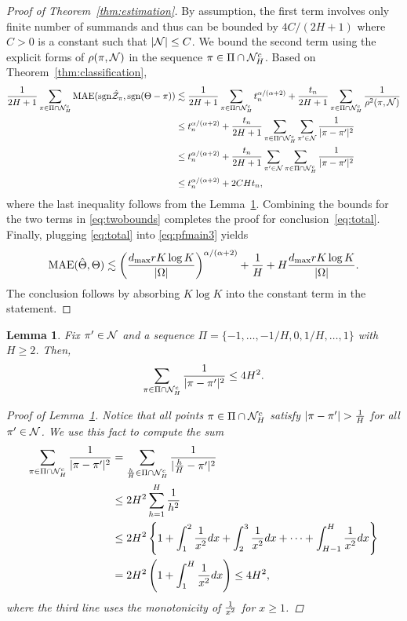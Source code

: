 \documentclass[11pt]{article}
\theoremstyle{plain}
\newtheorem{lem}{Lemma}[section]
\theoremstyle{definition}
\def\sign{\textup{sgn}}
\begin{document}
\begin{proof}[Proof of Theorem~\ref{thm:estimation}]
By assumption, the first term involves only finite number of summands and thus can be bounded by $4C/ (2H+1)$ where $C>0$ is a constant such that $|\mathcal{N}|\leq C$.  We bound the second term using the explicit forms of $\rho(\pi, \mathcal{N})$ in the sequence $\pi \in\Pi\cap \mathcal{N}_H^c$. Based on Theorem~\ref{thm:classification}, 
\begin{align}
{1\over 2H+1}\sum_{\pi \in \Pi\cap \tN_H^c} \textup{MAE}(\sign \hat \tZ_\pi, \sign (\Theta-\pi)) &\lesssim  {1\over 2H+1}\sum_{\pi\in \Pi\cap \tN_H^c} t_n^{\alpha/(\alpha+2)}+{t_n\over 2H+1}\sum_{\pi \in \Pi\cap \tN_H^c}{1\over \rho^2(\pi, \tN)}\\
&\leq t_n^{\alpha/(\alpha+2)}+{t_n\over 2H+1} \sum_{\pi \in \Pi\cap \tN_H^c} \sum_{\pi' \in \tN}{1\over |\pi-\pi'|^2}\\
&\leq  t_n^{\alpha/(\alpha+2)}+{t_n\over 2H+1} \sum_{\pi'\in \tN} \sum_{\pi \in \Pi\cap \tN_H^c}{1\over |\pi-\pi'|^2}\\
&\leq t_n^{\alpha/(\alpha+2)}+ 2CHt_n,
\end{align}
where the last inequality follows from the Lemma~\ref{lem:H}.  Combining the bounds for the two terms in \eqref{eq:twobounds} completes the proof for conclusion~\eqref{eq:total}. Finally, plugging \eqref{eq:total} into \eqref{eq:pfmain3} yields
\begin{align}
\text{MAE}(\hat\Theta,\Theta)\lesssim \left(d_{\max}rK\log K\over |\Omega|\right)^{\alpha/(\alpha+2)}+\frac{1}{H}+H{d_{\max}rK\log K\over |\Omega|}.
 \end{align}
The conclusion follows by absorbing $K\log K$ into the constant term in the statement. 
\end{proof}


\begin{lem}\label{lem:H}
Fix $\pi'\in\mathcal{N}$ and a sequence $\Pi=\{-1,\ldots,-1/H,0,1/H,\ldots,1\}$ with $H\geq 2$. Then, 
\[
\sum_{\pi \in \Pi\cap \mathcal{N}_H^c}{1\over 
|\pi-\pi'|^2}\leq 4H^2. 
\]
\begin{proof}[Proof of Lemma~\ref{lem:H}]
Notice that all points $\pi\in\Pi\cap\mathcal{N}_H^c$ satisfy $|\pi-\pi'|>{1\over H}$ for all $\pi'\in\mathcal{N}$. We use this fact to compute the sum
\begin{align}
   \sum_{\pi \in \Pi\cap \mathcal{N}_H^c}{1\over |\pi-\pi'|^2}&= \sum_{\frac{h}{H}\in\Pi\cap \mathcal{N}_H^c } {1\over |\frac{h}{H}-\pi'|^2}\\
   &\leq 2H^2\sum_{h=1}^{H}{1 \over h^2}\\
 &\leq 2H^2\left\{ 1+\int_{1}^2{1\over x^2}dx+ \int_{2}^3{1\over x^2}dx+\cdots + \int_{H-1}^H{1\over x^2}dx\right\}\\
&= 2H^2\left(1+\int^{H}_{1}{1\over x^2}dx\right) \leq 4H^2,
\end{align}
 where the third line uses the monotonicity of ${1\over x^2}$ for $x\geq 1$. 
 \end{proof}
\end{lem}






\end{document}
